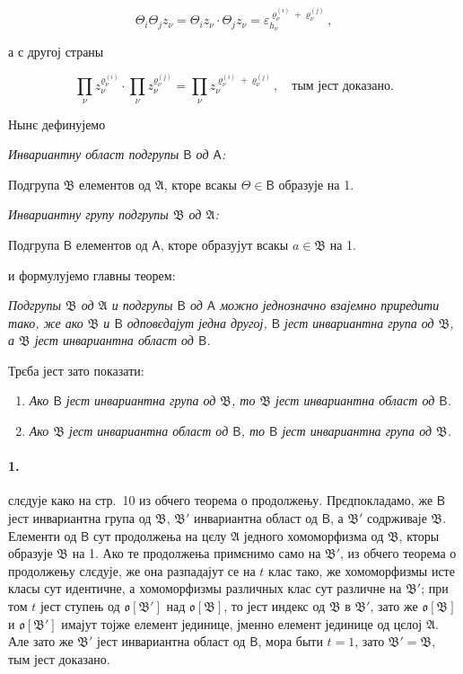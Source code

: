 \documentclass[11pt]{article}
\begin{document}
\[
\Theta_i\Theta_j z_\nu=\Theta_i z_\nu\cdot \Theta_j z_\nu
=\varepsilon_{h_\nu}^{\varrho_\nu^{(i)}+\varrho_\nu^{(j)}},
\]

а с другој страны

\[
\prod_\nu z_\nu^{\varrho_\nu^{(i)}}\cdot
\prod_\nu z_\nu^{\varrho_\nu^{(j)}}=
\prod_\nu z_\nu^{\varrho_\nu^{(i)}+\varrho_\nu^{(j)}},
\quad\text{тым јест доказано.}
\]

Нынє дефинујемо

\emph{Инвариантну област подгрупы \(\mathsf B\) од \(\mathsf A\):}

Подгрупа \(\mathfrak B\) елементов од \(\mathfrak A\), кторе всакы \(\Theta\in\mathsf B\) образује на 1.

\emph{Инвариантну групу подгрупы \(\mathfrak B\) од \(\mathfrak A\):}

Подгрупа \(\mathsf B\) елементов од \(\mathsf A\), кторе образујут всакы \(a\in\mathfrak B\) на 1.

и формулујемо главны теорем:

\emph{Подгрупы \(\mathfrak B\) од \(\mathfrak A\) и подгрупы \(\mathsf B\) од \(\mathsf A\) можно једнозначно взајемно приредити тако, же ако \(\mathfrak B\) и \(\mathsf B\) одповєдајут једна другој, \(\mathsf B\) јест инвариантна група од \(\mathfrak B\), а \(\mathfrak B\) јест инвариантна област од \(\mathsf B\).}

Трєба јест зато показати:

\begin{enumerate}
\item \emph{Ако \(\mathsf B\) јест инвариантна група од \(\mathfrak B\), то \(\mathfrak B\) јест инвариантна област од \(\mathsf B\).}
\item \emph{Ако \(\mathfrak B\) јест инвариантна област од \(\mathsf B\), то \(\mathsf B\) јест инвариантна група од \(\mathfrak B\).}
\end{enumerate}

\paragraph{1.}
слєдује како на стр.~10 из обчего теорема о продолжењу. Прєдпокладамо, же \(\mathsf B\) јест инвариантна група од \(\mathfrak B\), \(\mathfrak B'\) инвариантна област од \(\mathsf B\), а \(\mathfrak B'\) содрживаје \(\mathfrak B\). Елементи од \(\mathsf B\) сут продолжења на цєлу \(\mathfrak A\) једного хомоморфизма од \(\mathfrak B\), кторы образује \(\mathfrak B\) на 1. Ако те продолжења примєнимо само на \(\mathfrak B'\), из обчего теорема о продолжењу слєдује, же она разпадајут се на \(t\) клас тако, же хомоморфизмы исте класы сут идентичне, а хомоморфизмы различных клас сут различне на \(\mathfrak B'\); при том \(t\) јест ступењ од \(\mathfrak o[\mathfrak B']\) над \(\mathfrak o[\mathfrak B]\), то јест индекс од \(\mathfrak B\) в \(\mathfrak B'\), зато же \(\mathfrak o[\mathfrak B]\) и \(\mathfrak o[\mathfrak B']\) имајут тојже елемент јединице, јменно елемент јединице од цєлој \(\mathfrak A\). Але зато же \(\mathfrak B'\) јест инвариантна област од \(\mathsf B\), мора быти \(t=1\), зато \(\mathfrak B'=\mathfrak B\), тым јест доказано.
\end{document}
